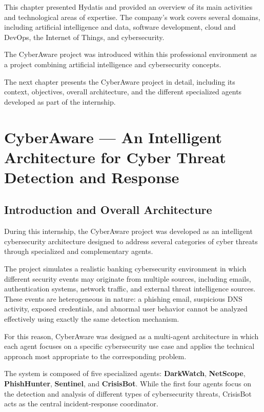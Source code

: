 \documentclass[12pt,a4paper]{report}
\newcommand{\ProjectName}{CyberAware}
\begin{document}
This chapter presented Hydatis and provided an overview of its main activities and technological areas of expertise. The company's work covers several domains, including artificial intelligence and data, software development, cloud and DevOps, the Internet of Things, and cybersecurity.

The CyberAware project was introduced within this professional environment as a project combining artificial intelligence and cybersecurity concepts.

The next chapter presents the CyberAware project in detail, including its context, objectives, overall architecture, and the different specialized agents developed as part of the internship.

\chapter{\ProjectName{} --- An Intelligent Architecture for Cyber Threat Detection and Response}
\markboth{Chapter 2: \ProjectName{}}{}

\section{Introduction and Overall Architecture}

During this internship, the \ProjectName{} project was developed as an intelligent cybersecurity architecture designed to address several categories of cyber threats through specialized and complementary agents.

The project simulates a realistic banking cybersecurity environment in which different security events may originate from multiple sources, including emails, authentication systems, network traffic, and external threat intelligence sources. These events are heterogeneous in nature: a phishing email, suspicious DNS activity, exposed credentials, and abnormal user behavior cannot be analyzed effectively using exactly the same detection mechanism.

For this reason, \ProjectName{} was designed as a multi-agent architecture in which each agent focuses on a specific cybersecurity use case and applies the technical approach most appropriate to the corresponding problem.

The system is composed of five specialized agents: \textbf{DarkWatch}, \textbf{NetScope}, \textbf{PhishHunter}, \textbf{Sentinel}, and \textbf{CrisisBot}. While the first four agents focus on the detection and analysis of different types of cybersecurity threats, CrisisBot acts as the central incident-response coordinator.
\end{document}
